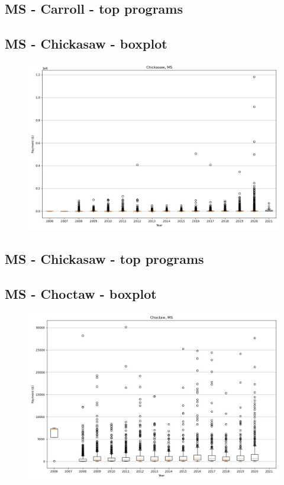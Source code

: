 \subsection*{MS - Carroll - top programs}

\newpage
\subsection*{MS - Chickasaw - boxplot}
\begin{figure}[h]
\centering
\includegraphics[width=7in]{../output/boxplots/counties/Chickasaw-MS_boxplot.png}
\end{figure}


\subsection*{MS - Chickasaw - top programs}

\newpage
\subsection*{MS - Choctaw - boxplot}
\begin{figure}[h]
\centering
\includegraphics[width=7in]{../output/boxplots/counties/Choctaw-MS_boxplot.png}
\end{figure}



